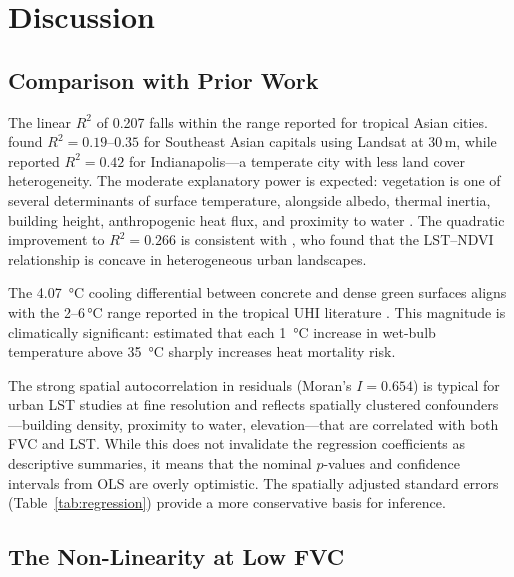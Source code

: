 \documentclass[preprint,12pt]{elsarticle}
\begin{document}
\section{Discussion}
\label{sec:discussion}

\subsection{Comparison with Prior Work}

The linear $R^2$ of 0.207 falls within the range reported for tropical Asian cities. \citet{estoque2017} found $R^2 = 0.19$--$0.35$ for Southeast Asian capitals using Landsat at 30\,m, while \citet{weng2004} reported $R^2 = 0.42$ for Indianapolis---a temperate city with less land cover heterogeneity. The moderate explanatory power is expected: vegetation is one of several determinants of surface temperature, alongside albedo, thermal inertia, building height, anthropogenic heat flux, and proximity to water \citep{oke1982,li2013}. The quadratic improvement to $R^2 = 0.266$ is consistent with \citet{li2013}, who found that the LST--NDVI relationship is concave in heterogeneous urban landscapes.

The \SI{4.07}{\degreeCelsius} cooling differential between concrete and dense green surfaces aligns with the 2--6\,\si{\degreeCelsius} range reported in the tropical UHI literature \citep{tan2010,hua2021}. This magnitude is climatically significant: \citet{mora2017} estimated that each \SI{1}{\degreeCelsius} increase in wet-bulb temperature above \SI{35}{\degreeCelsius} sharply increases heat mortality risk.

The strong spatial autocorrelation in residuals (Moran's $I = 0.654$) is typical for urban LST studies at fine resolution and reflects spatially clustered confounders---building density, proximity to water, elevation---that are correlated with both FVC and LST. While this does not invalidate the regression coefficients as descriptive summaries, it means that the nominal $p$-values and confidence intervals from OLS are overly optimistic. The spatially adjusted standard errors (Table~\ref{tab:regression}) provide a more conservative basis for inference.

\subsection{The Non-Linearity at Low FVC}
\end{document}
